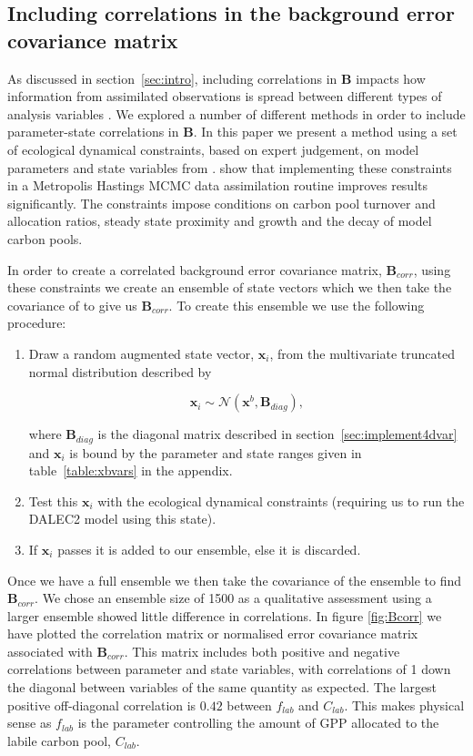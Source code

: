 \documentclass[review]{elsarticle}
\begin{document}
\subsection{Including correlations in the background error covariance matrix} \label{sec:corB}

As discussed in section~\ref{sec:intro}, including correlations in \textbf{B} impacts how information from assimilated observations is spread between different types of analysis variables \citep{bannister2008review}. We explored a number of different methods in order to include parameter-state correlations in \textbf{B}. In this paper we present a method using a set of ecological dynamical constraints, based on expert judgement, on model parameters and state variables from \citet{Bloom2015}. \citet{Bloom2015} show that implementing these constraints in a Metropolis Hastings MCMC data assimilation routine improves results significantly. The constraints impose conditions on carbon pool turnover and allocation ratios, steady state proximity and growth and the decay of model carbon pools.

In order to create a correlated background error covariance matrix, $\textbf{B}_{corr}$, using these constraints we create an ensemble of state vectors which we then take the covariance of to give us $\textbf{B}_{corr}$. To create this ensemble we use the following procedure:
\begin{enumerate}
\item Draw a random augmented state vector, $\textbf{x}_i$, from the multivariate truncated normal distribution described by
\begin{linenomath}
\begin{equation}
\textbf{x}_i \sim \mathcal{N}(\textbf{x}^b, \textbf{B}_{diag}),
\end{equation} 
\end{linenomath}
where $\textbf{B}_{diag}$ is the diagonal matrix described in section~\ref{sec:implement4dvar} and $\textbf{x}_i$ is bound by the parameter and state ranges given in table~\ref{table:xbvars} in the appendix.
\item Test this $\textbf{x}_i$ with the ecological dynamical constraints (requiring us to run the DALEC2 model using this state).
\item If $\textbf{x}_i$ passes it is added to our ensemble, else it is discarded.
\end{enumerate}
Once we have a full ensemble we then take the covariance of the ensemble to find $\textbf{B}_{corr}$. We chose an ensemble size of 1500 as a qualitative assessment using a larger ensemble showed little difference in correlations. In figure \ref{fig:Bcorr} we have plotted the correlation matrix or normalised error covariance matrix associated with $\textbf{B}_{corr}$. This matrix includes both positive and negative correlations between parameter and state variables, with correlations of 1 down the diagonal between variables of the same quantity as expected. The largest positive off-diagonal correlation is $0.42$ between $f_{lab}$ and $C_{lab}$. This makes physical sense as $f_{lab}$ is the parameter controlling the amount of GPP allocated to the labile carbon pool, $C_{lab}$.
\end{document}
